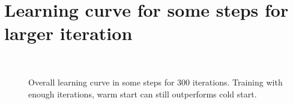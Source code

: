 ﻿\section{Learning curve for some steps for larger iteration}\label{app:conv}
\begin{figure}[htbp]
\centering
{}
\\
\caption{Overall learning curve in some steps for 300 iterations. Training with enough iterations, warm start can still outperforms cold start.}
\label{fig:errdiff}
\end{figure}